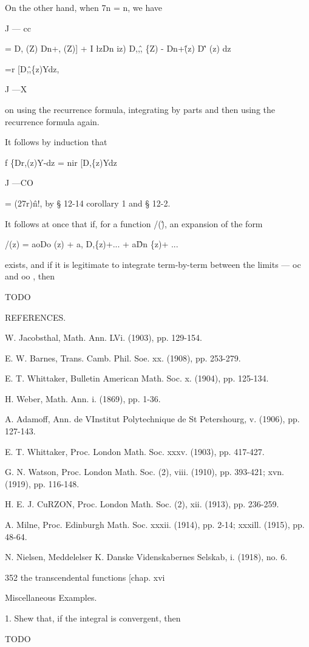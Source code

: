 On the other hand, when 7n = n, we have

J — cc

= D, (Z) Dn+, (Z)] + I \l zDn iz) D,,\^, \{Z) - Dn+\^ (z) D\^' (z) dz

=r [D,\^,\{z)Ydz,

J —X

on using the recurrence formula, integrating by parts and then using
the recurrence formula again.

It follows by induction that

f \{Dr,(z)Y-dz = nir [D,\{z)Ydz

J —CO

= (27r)\^n!, by § 12-14 corollary 1 and § 12-2.

It follows at once that if, for a function /(\^), an expansion of the
form

/(z) = aoDo (z) + a, D,\{z)+... + a\^Dn \{z)+ ...

exists, and if it is legitimate to integrate term-by-term between the
limits — oc and oo , then

TODO

REFERENCES.

W. Jacobsthal, Math. Ann. LVi. (1903), pp. 129-154.

E. W. Barnes, Trans. Camb. Phil. Soe. xx. (1908), pp. 253-279.

E. T. Whittaker, Bulletin American Math. Soc. x. (1904), pp. 125-134.

H. Weber, Math. Ann. i. (1869), pp. 1-36.

A. Adamoff, Ann. de VInstitut Polytechnique de St Petershourg, v.
(1906), pp. 127-143.

E. T. Whittaker, Proc. London Math. Soc. xxxv. (1903), pp. 417-427.

G. N. Watson, Proc. London Math. Soc. (2), viii. (1910), pp. 393-421;
xvn. (1919), pp. 116-148.

H. E. J. CuRZON, Proc. London Math. Soc. (2), xii. (1913), pp.
236-259.

A. Milne, Proc. Edinburgh Math. Soc. xxxii. (1914), pp. 2-14; xxxill.
(1915), pp. 48-64.

N. Nielsen, Meddelelser K. Danske Videnskabernes Selskab, i. (1918),
no. 6.

352 the transcendental functions [chap. xvi

Miscellaneous Examples.

1. Shew that, if the integral is convergent, then

TODO

